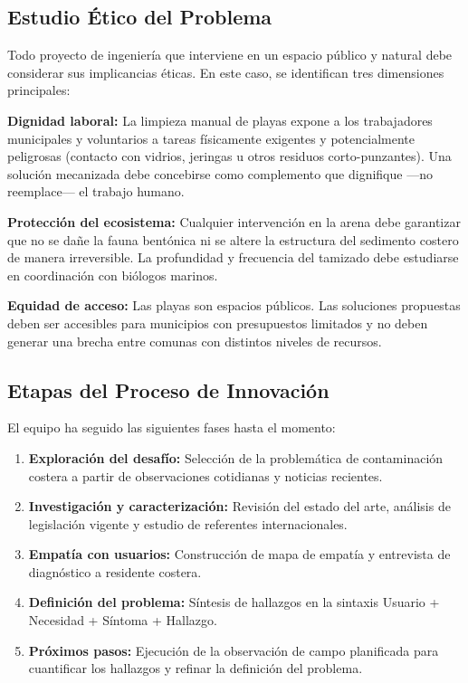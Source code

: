 \documentclass[12pt, letterpaper]{article}
\begin{document}
\subsection{Estudio Ético del Problema}

Todo proyecto de ingeniería que interviene en un espacio público y natural debe considerar
sus implicancias éticas. En este caso, se identifican tres dimensiones principales:

\textbf{Dignidad laboral:} La limpieza manual de playas expone a los trabajadores
municipales y voluntarios a tareas físicamente exigentes y potencialmente peligrosas
(contacto con vidrios, jeringas u otros residuos corto-punzantes). Una solución
mecanizada debe concebirse como complemento que dignifique ---no reemplace---
el trabajo humano.

\textbf{Protección del ecosistema:} Cualquier intervención en la arena debe
garantizar que no se dañe la fauna bentónica ni se altere la estructura del sedimento
costero de manera irreversible. La profundidad y frecuencia del tamizado debe
estudiarse en coordinación con biólogos marinos.

\textbf{Equidad de acceso:} Las playas son espacios públicos. Las soluciones
propuestas deben ser accesibles para municipios con presupuestos limitados y no
deben generar una brecha entre comunas con distintos niveles de recursos.

\subsection{Etapas del Proceso de Innovación}

El equipo ha seguido las siguientes fases hasta el momento:

\begin{enumerate}
	\item \textbf{Exploración del desafío:} Selección de la problemática de
	      contaminación costera a partir de observaciones cotidianas y noticias recientes.
	\item \textbf{Investigación y caracterización:} Revisión del estado del arte,
	      análisis de legislación vigente y estudio de referentes internacionales.
	\item \textbf{Empatía con usuarios:} Construcción de mapa de empatía y
	      entrevista de diagnóstico a residente costera.
	\item \textbf{Definición del problema:} Síntesis de hallazgos en la sintaxis
	      Usuario + Necesidad + Síntoma + Hallazgo.
	\item \textbf{Próximos pasos:} Ejecución de la observación de campo planificada
	      para cuantificar los hallazgos y refinar la definición del problema.
\end{enumerate}
\end{document}
